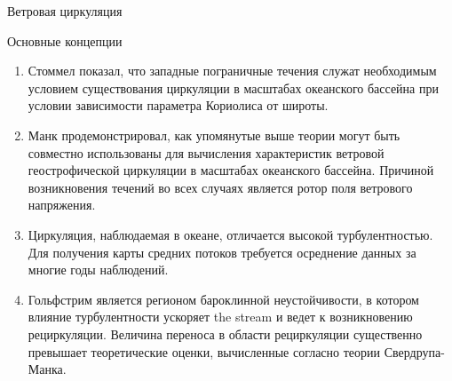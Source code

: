 \begin{chapter}{Ветровая циркуляция}
\begin{section}{Основные концепции}
\begin{enumerate}
\item 
Стоммел показал, что западные пограничные течения служат
необходимым условием существования циркуляции в масштабах океанского бассейна
при условии зависимости параметра Кориолиса
от широты.
%

\item 
Манк продемонстрировал, как упомянутые выше теории могут быть совместно
использованы для вычисления характеристик ветровой геострофической циркуляции%
 в масштабах океанского бассейна.
Причиной возникновения течений во всех случаях является ротор поля ветрового
напряжения.
%

\item
Циркуляция, наблюдаемая в океане, отличается высокой турбулентностью.
Для получения карты средних потоков требуется осреднение данных
за многие годы наблюдений. 
%

\item 
Гольфстрим является регионом бароклинной неустойчивости,
в котором влияние турбулентности
ускоряет the stream и ведет к возникновению рециркуляции. Величина переноса
в области рециркуляции существенно превышает теоретические 
оценки, вычисленные согласно теории Свердрупа-Манка.
%
\end{enumerate}
\end{section}
\end{chapter}